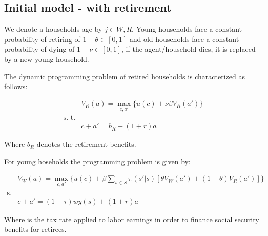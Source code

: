 \documentclass[12pt]{article}
\begin{document}
\subsection{Initial model - with retirement}

We denote a households age by $j\in{W,R}$. Young households face a constant probability of retiring of $1-\theta \in[0,1]$ and old households face a constant probability of dying of $1-\nu \in[0,1]$, if the agent/household dies, it is replaced by a new young household.

The dynamic programming problem of retired households is characterized as follows:

\begin{align*}
&V_R(a)=\max_{c,a'}\{u(c) + \nu\beta V_R(a')\} \\
\text{s. t.} \\&c+a'= b_R + (1+r)a
\end{align*}

Where $b_R$ denotes the retirement benefits.

For young hoseholds the programming problem is given by:

\begin{align*}
&V_W(a)=\max_{c,a'}\{u(c) + \beta\sum_{s\in S} \pi(s'|s)[\theta V_W(a') +(1-\theta)V_R(a')]\} \\
\text{s. t.} \\&c+a'= (1-\tau) w y(s) + (1+r)a
\end{align*}

Where \tau is the tax rate applied to labor earnings in order to finance social security benefits for retirees.
\end{document}
